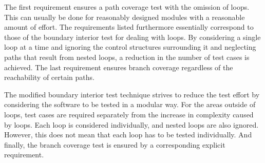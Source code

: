 	The first requirement ensures a path coverage test with the omission of loops. This can usually be done for reasonably designed modules with a reasonable amount of effort. The requirements listed furthermore essentially correspond to those of the boundary interior test for dealing with loops. By considering a single loop at a time and ignoring the control structures surrounding it and neglecting paths that result from nested loops, a reduction in the number of test cases is achieved. The last requirement ensures branch coverage regardless of the reachability of certain paths.

	The modified boundary interior test technique strives to reduce the test effort by considering the software to be tested in a modular way. For the areas outside of loops, test cases are required separately from the increase in complexity caused by loops. Each loop is considered individually, and nested loops are also ignored. However, this does not mean that each loop has to be tested individually. And finally, the branch coverage test is ensured by a corresponding explicit requirement.	


